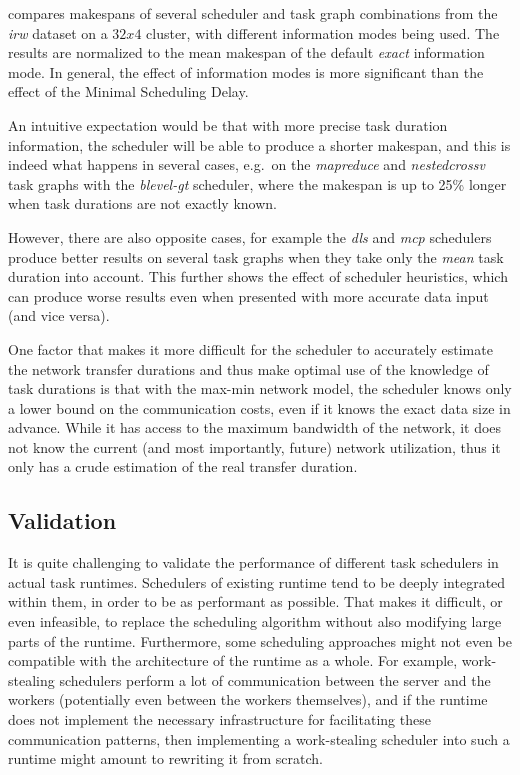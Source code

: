  compares makespans of several scheduler and task graph combinations
from the \emph{irw} dataset on a $32x4$ cluster, with different
information modes being used. The results are normalized to the mean makespan of the default
\emph{exact} information mode. In general, the effect of information modes is more
significant than the effect of the Minimal Scheduling Delay.

An intuitive expectation would be that with more precise task duration information, the scheduler
will be able to produce a shorter makespan, and this is indeed what happens in several cases, e.g.\
on the \emph{mapreduce} and \emph{nestedcrossv} task graphs with the
\emph{blevel-gt} scheduler, where the makespan is up to 25\% longer when task durations are
not exactly known.

However, there are also opposite cases, for example the \emph{dls} and
\emph{mcp} schedulers produce better results on several task graphs when they take
only the \emph{mean} task duration into account. This further shows the effect of
scheduler heuristics, which can produce worse results even when presented with more accurate data
input (and vice versa).

One factor that makes it more difficult for the scheduler to accurately estimate the network
transfer durations and thus make optimal use of the knowledge of task durations is that with the
max-min network model, the scheduler knows only a lower bound on the communication costs, even if
it knows the exact data size in advance. While it has access to the maximum bandwidth of the
network, it does not know the current (and most importantly, future) network utilization, thus it
only has a crude estimation of the real transfer duration.

\subsection{Validation}
It is quite challenging to validate the performance of different task schedulers in actual task
runtimes. Schedulers of existing runtime tend to be deeply integrated within them, in order to be
as performant as possible. That makes it difficult, or even infeasible, to replace the scheduling
algorithm without also modifying large parts of the runtime. Furthermore, some scheduling
approaches might not even be compatible with the architecture of the runtime as a whole. For
example, work-stealing schedulers perform a lot of communication between the server and the workers
(potentially even between the workers themselves), and if the runtime does not implement the
necessary infrastructure for facilitating these communication patterns, then implementing a
work-stealing scheduler into such a runtime might amount to rewriting it from scratch.

